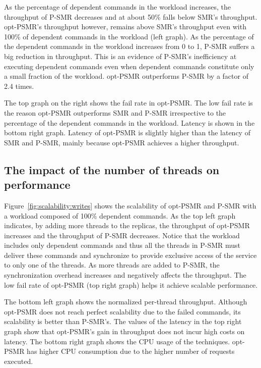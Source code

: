 \documentclass[conference]{IEEEtran}
\begin{document}
As the percentage of dependent commands in the workload increases, the throughput of P-SMR decreases and at about 50\% falls below SMR's throughput. opt-PSMR's throughput however, remains above SMR's throughput even with 100\% of dependent commands in the workload (left graph). As the percentage of the dependent commands in the workload increases from 0 to 1, P-SMR suffers a big reduction in throughput. This is an evidence of P-SMR's inefficiency at executing dependent commands even when dependent commands constitute only a small fraction of the workload. opt-PSMR outperforms P-SMR by a factor of 2.4 times. 

The top graph on the right shows the fail rate in opt-PSMR. The low fail rate is the reason opt-PSMR outperforms SMR and P-SMR irrespective to the percentage of the dependent commands in the workload. Latency is shown in the bottom right graph. Latency of opt-PSMR is slightly higher than the latency of SMR and P-SMR, mainly because opt-PSMR achieves a higher throughput. 

\subsection{The impact of the number of threads on performance}
\label{exp:scalability}

Figure~\ref{fig:scalability:writes} shows the scalability of opt-PSMR and P-SMR with a workload composed of 100\% dependent commands. As the top left graph indicates, by adding more threads to the replicas, the throughput of opt-PSMR increases and the throughput of P-SMR decreases. Notice that the workload includes only dependent commands and thus all the threads in P-SMR must deliver these commands and synchronize to provide exclusive access of the service to only one of the threads. As more threads are added to P-SMR, the synchronization overhead increases and negatively affects the throughput. The low fail rate of opt-PSMR (top right graph) helps it achieve scalable performance.

The bottom left graph shows the normalized per-thread throughput. Although opt-PSMR does not reach perfect scalability due to the failed commands, its scalability is better than P-SMR's. The values of the latency in the top right graph show that opt-PSMR's gain in throughput does not incur high costs on latency. The bottom right graph shows the CPU usage of the techniques. opt-PSMR has higher CPU consumption due to the higher number of requests executed. 
\end{document}
